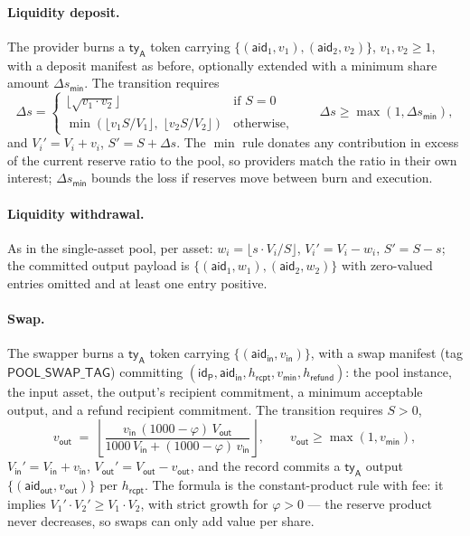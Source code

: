 \paragraph{Liquidity deposit.} The provider burns a $\mathsf{ty}_\mathsf{A}$ token carrying $\{(\mathsf{aid}_1, v_1), (\mathsf{aid}_2, v_2)\}$, $v_1, v_2 \ge 1$, with a deposit manifest as before, optionally extended with a minimum share amount $\Delta s_\mathsf{min}$. The transition requires
\[
\Delta s =
\begin{cases}
	\lfloor\sqrt{v_1 \cdot v_2}\rfloor & \text{if } S = 0\\
	\min\!\left(\lfloor v_1 S / V_1 \rfloor,\; \lfloor v_2 S / V_2 \rfloor\right) & \text{otherwise,}
\end{cases}
\qquad \Delta s \ge \max(1, \Delta s_\mathsf{min}),
\]
and $V_i' = V_i + v_i$, $S' = S + \Delta s$. The $\min$ rule donates any contribution in excess of the current reserve ratio to the pool, so providers match the ratio in their own interest; $\Delta s_\mathsf{min}$ bounds the loss if reserves move between burn and execution.

\paragraph{Liquidity withdrawal.} As in the single-asset pool, per asset: $w_i = \lfloor s \cdot V_i / S \rfloor$, $V_i' = V_i - w_i$, $S' = S - s$; the committed output payload is $\{(\mathsf{aid}_1, w_1), (\mathsf{aid}_2, w_2)\}$ with zero-valued entries omitted and at least one entry positive.

\paragraph{Swap.} The swapper burns a $\mathsf{ty}_\mathsf{A}$ token carrying $\{(\mathsf{aid}_\mathsf{in}, v_\mathsf{in})\}$, with a swap manifest (tag $\mathsf{POOL\_SWAP\_TAG}$) committing $(\mathsf{id}_\mathsf{P}, \mathsf{aid}_\mathsf{in}, h_\mathsf{rcpt}, v_\mathsf{min}, h_\mathsf{refund})$: the pool instance, the input asset, the output's recipient commitment, a minimum acceptable output, and a refund recipient commitment. The transition requires $S > 0$,
\[
v_\mathsf{out} \;=\; \left\lfloor
\frac{v_\mathsf{in} \, (1000 - \varphi) \, V_\mathsf{out}}
     {1000 \, V_\mathsf{in} + (1000 - \varphi) \, v_\mathsf{in}}
\right\rfloor,
\qquad
v_\mathsf{out} \ge \max(1, v_\mathsf{min}),
\]
$V_\mathsf{in}' = V_\mathsf{in} + v_\mathsf{in}$, $V_\mathsf{out}' = V_\mathsf{out} - v_\mathsf{out}$, and the record commits a $\mathsf{ty}_\mathsf{A}$ output $\{(\mathsf{aid}_\mathsf{out}, v_\mathsf{out})\}$ per $h_\mathsf{rcpt}$. The formula is the constant-product rule with fee: it implies $V_1' \cdot V_2' \ge V_1 \cdot V_2$, with strict growth for $\varphi > 0$ --- the reserve product never decreases, so swaps can only add value per share.

